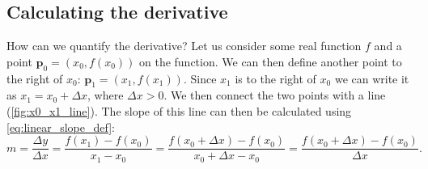 



\subsection{Calculating the derivative}
\label{sub:calculating the derivative}
How can we quantify the derivative? Let us consider some real function $f$ and a point $\bm{p}_{0} = \left(x_{0},f\left(x_{0}\right)\right)$ on the function. We can then define another point to the right of $x_{0}$: $\bm{p}_{1}=\left(x_{1},f\left(x_{1}\right)\right)$. Since $x_{1}$ is to the right of $x_{0}$ we can write it as $x_{1}=x_{0}+\Delta x$, where $\Delta x>0$. We then connect the two points with a line (\autoref{fig:x0_x1_line}). The slope of this line can then be calculated using \autoref{eq:linear_slope_def}:
\begin{equation}
  m = \frac{\Delta y}{\Delta x} = \frac{f\left(x_{1}\right)-f\left(x_{0}\right)}{x_{1}-x_{0}} = \frac{f\left(x_{0}+\Delta x\right)-f\left(x_{0}\right)}{x_{0}+\Delta x - x_{0}} = \frac{f\left(x_{0}+\Delta x\right)-f\left(x_{0}\right)}{\Delta x}.
  \label{eq:derivative_slope_def}
\end{equation}

